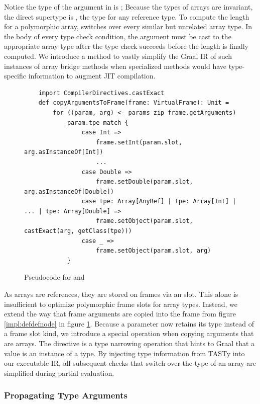 Notice the type of the argument in  is ; Because the types of arrays are invariant, the direct supertype is , the type for any reference type.
To compute the length for a polymorphic array,  switches over every similar but unrelated array type.
In the body of every type check condition, the argument must be cast to the appropriate array type after the type check succeeds before the length is finally computed.
We introduce a method to vastly simplify the Graal IR of such instances of array bridge methods when specialized methods would have type-specific information to augment JIT compilation.

\begin{figure}[!htb]
	\begin{verbatim}
	import CompilerDirectives.castExact
	def copyArgumentsToFrame(frame: VirtualFrame): Unit = 
		for ((param, arg) <- params zip frame.getArguments) 
			param.tpe match {
				case Int =>
					frame.setInt(param.slot, arg.asInstanceOf[Int])
					...
				case Double =>
					frame.setDouble(param.slot, arg.asInstanceOf[Double])	
				case tpe: Array[AnyRef] | tpe: Array[Int] | ... | tpe: Array[Double] =>
					frame.setObject(param.slot, castExact(arg, getClass(tpe)))
				case _ =>
					frame.setObject(param.slot, arg)
			}
	\end{verbatim}
	\caption{Pseudocode for  and }
	\label{impl:specialized-copy-arguments}
\end{figure}

As arrays are references, they are stored on frames via an  slot.
This alone is insufficient to optimize polymorphic frame slots for array types.
Instead, we extend the way that frame arguments are copied into the frame from figure \ref{impl:defdefnode} in figure \ref{impl:specialized-copy-arguments}.
Because a parameter now retains its type instead of a frame slot kind, we introduce a special operation when copying arguments that are arrays. 
The  directive is a type narrowing operation that hints to Graal that a value is an instance of a type.
By injecting type information from TASTy into our executable IR, all subsequent checks that switch over the type of an array are simplified during partial evaluation.

\subsubsection*{Propagating Type Arguments}

